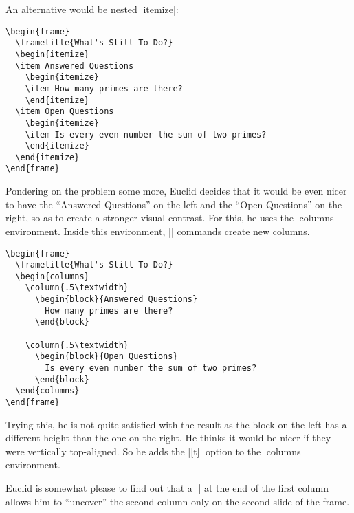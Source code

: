 An alternative would be nested |itemize|:
\begin{verbatim}
\begin{frame}
  \frametitle{What's Still To Do?}
  \begin{itemize}
  \item Answered Questions
    \begin{itemize}
    \item How many primes are there?
    \end{itemize}
  \item Open Questions
    \begin{itemize}
    \item Is every even number the sum of two primes?
    \end{itemize}
  \end{itemize}
\end{frame}
\end{verbatim}
Pondering on the problem some more, Euclid decides that it would be
even nicer to have the ``Answered Questions'' on the left and the
``Open Questions'' on the right, so as to create a stronger visual
contrast. For this, he uses the |columns| environment. Inside this
environment, |\column| commands create new columns.
\begin{verbatim}
\begin{frame}
  \frametitle{What's Still To Do?}
  \begin{columns}
    \column{.5\textwidth}
      \begin{block}{Answered Questions}
        How many primes are there?
      \end{block}

    \column{.5\textwidth}
      \begin{block}{Open Questions}
        Is every even number the sum of two primes?
      \end{block}
  \end{columns}
\end{frame}
\end{verbatim}
Trying this, he is not quite satisfied with the result as the block on
the left has a different height than the one on the right. He thinks it
would be nicer if they were vertically top-aligned. So he adds the
|[t]| option to the |columns| environment.

Euclid is somewhat please to find out that a |\pause| at the end of
the first column allows him to ``uncover'' the second column only on
the second slide of the frame.



